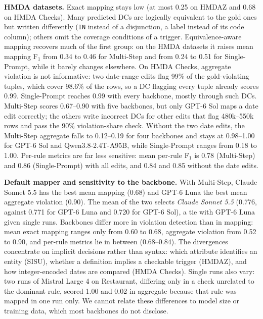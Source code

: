 \begin{table}[!ht]
  \centering
  \caption{Mean mapping quality over the six datasets (ground-truth sentences). CM: exact mapping F$_1$; CM$_{\equiv}$: equivalence-aware mapping F$_1$; AV: aggregate violation F$_1$; Rule-F$_1$: mean per-rule violation F$_1$; Exec.: execution equivalence; Fail.: sentences with no valid output.}
  \label{tab:mapping-metrics}
  \small
  \setlength{\tabcolsep}{3.5pt}
  \resizebox{\columnwidth}{!}{}
  
\end{table}

\smallskip\noindent\textbf{HMDA datasets.}
Exact mapping stays low (at most 0.25 on HMDAZ and 0.68 on HMDA Checks). Many predicted DCs are logically equivalent to the gold ones but written differently (\texttt{IN} instead of a disjunction, a label instead of its code column); others omit the coverage conditions of a trigger. Equivalence-aware mapping recovers much of the first group: on the HMDA datasets it raises mean mapping F$_1$ from 0.34 to 0.46 for Multi-Step and from 0.24 to 0.51 for Single-Prompt, while it barely changes elsewhere. On HMDA Checks, aggregate violation is not informative: two date-range edits flag 99\% of the gold-violating tuples, which cover 98.6\% of the rows, so a DC flagging every tuple already scores 0.99. Single-Prompt reaches 0.99 with every backbone, mostly through such DCs. Multi-Step scores 0.67--0.90 with five backbones, but only GPT-6 Sol maps a date edit correctly; the others write incorrect DCs for other edits that flag 480k--550k rows and pass the 90\% violation-share check. Without the two date edits, the Multi-Step aggregate falls to 0.12--0.19 for four backbones and stays at 0.98--1.00 for GPT-6 Sol and Qwen3.8-2.4T-A95B, while Single-Prompt ranges from 0.18 to 1.00. Per-rule metrics are far less sensitive: mean per-rule F$_1$ is 0.78 (Multi-Step) and 0.86 (Single-Prompt) with all edits, and 0.84 and 0.85 without the date edits.

\smallskip\noindent\textbf{Default mapper and sensitivity to the backbone.}
With Multi-Step, Claude Sonnet 5.5 has the best mean mapping (0.68) and GPT-6 Luna the best mean aggregate violation (0.90). The mean of the two selects \emph{Claude Sonnet 5.5} (0.776, against 0.771 for GPT-6 Luna and 0.720 for GPT-6 Sol), a tie with GPT-6 Luna given single runs. Backbones differ more in violation detection than in mapping: mean exact mapping ranges only from 0.60 to 0.68, aggregate violation from 0.52 to 0.90, and per-rule metrics lie in between (0.68--0.84). The divergences concentrate on implicit decisions rather than syntax: which attribute identifies an entity (SISU), whether a definition implies a checkable trigger (HMDAZ), and how integer-encoded dates are compared (HMDA Checks). Single runs also vary: two runs of Mistral Large 4 on Restaurant, differing only in a check unrelated to the dominant rule, scored 1.00 and 0.02 in aggregate because that rule was mapped in one run only. We cannot relate these differences to model size or training data, which most backbones do not disclose.
